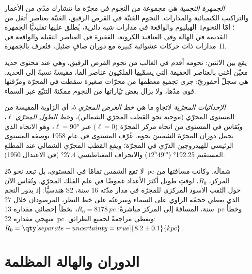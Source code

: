 \begin{definition}\label{def:b3:milky-way-galaxies:populations}
\emph{الجمهرة النجمية} هي مجموعة من النجوم
في مجرّة ما تتشارك مدًى من الأعمار والتراكيب الكيميائية
والمدارات. النجوم الفتيّة في القرص الرقيق، الغنيّة بعناصر أثقل من
الهيليوم والواقعة في مدارات شبه دائرية، يُطلق عليها تقليديًّا
الجمهرة~I؛ أمّا النجوم القديمة في الهالة وفي العناقيد الكروية، الفقيرة
في العناصر الثقيلة والواقعة في مدارات ذات حركات عشوائية كبيرة مع
دوران صافٍ ضئيل، فتُعرف بالجمهرة~II.
\end{definition}

يقع  بين الاثنين: نجومه أقدم في الغالب من نجوم
القرص الرقيق، وهي عند محتوى حديد معيّن أغنى بالعناصر الخفيفة
التي يسمّيها الفلكيون عناصر ألفا، مقيسةً نسبةً إلى الحديد.  هي
سجلّ أحفوريّ: جرى تجميع معظمها من مجرّات صغيرة سقطت
في المجرّة ومزّقتها قوى مدّها، ولا يزال بعض تيّاراتها من النجوم
ممكنةَ التتبّع عبر السماء.

\begin{definition}\label{def:b3:milky-way-galaxies:coordinates}
\emph{الإحداثيات المجرّية} لاتجاهٍ ما
هي \emph{خط العرض المجرّي} $b$، أي الزاوية المقيسة من المستوى المجرّي
(موجبة نحو القطب المجرّي الشمالي)، و\emph{خط الطول
المجرّي} $\ell$، ويُقاس في المستوى من اتجاه مركز المجرّة
($\ell = 0$) عبر $\ell = \ang{90}$، وهو
الاتجاه الذي يحمل دوران المجرّة الشمسَ نحوه. عُرّف المستوى في عام 1958
بوصفه المستوى الرئيسي للهيدروجين الذرّي في المجرّة؛
ويقع القطب المجرّي الشمالي عند المطلع المستقيم \ang{192.25}
($12^\mathrm{h}49^\mathrm{m}$) والانحراف المغناطيسي \ang{27.4} (في الاعتدال
1950).
\end{definition}

لا تقع الشمس تمامًا في المستوى، بل تبعد نحو \qty{25}{pc} شمالَه.
وكانت مسافتها من المركز، $R_0$، لوقتٍ طويل أكثرَ الأعداد غموضًا في
علم الفلك المجرّي. وتُقاس الآن هندسيًّا: إذ يدور النجم S2 حول
الثقب الأسود المركزي للمجرّة في مدار مدّته \num{16} سنة، الذي
يعطي حجمُه الزاوي على السماء وسرعتُه على خط النظر، المرصودان
خلال 27 سنة، المسافةَ إلى المركز مباشرةً:
$R_0 = \qty{8178}{pc}$، بخطأ إحصائي مقداره \qty{13}{pc} وخطأ
منهجي مقداره \qty{22}{pc}. وتعطي مراجعةٌ لجميع الطرائق:
$R_0 = \qty[separate-uncertainty=true]{8.2 \pm 0.1}{kpc}$.

\section{الدوران والهالة المظلمة}\label{sec:b3:milky-way-galaxies:rotation}

